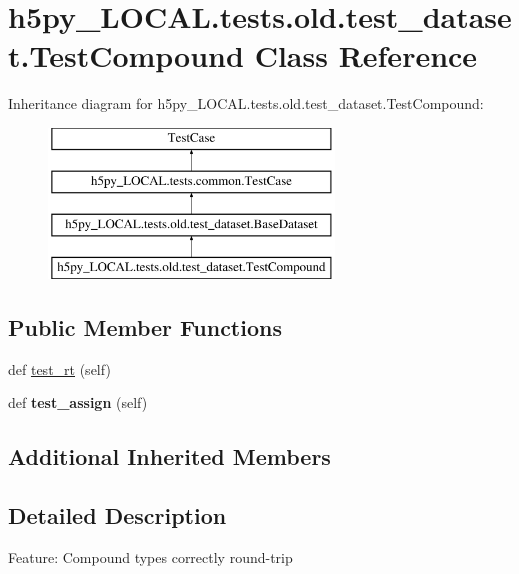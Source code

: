 \hypertarget{classh5py__LOCAL_1_1tests_1_1old_1_1test__dataset_1_1TestCompound}{}\section{h5py\+\_\+\+L\+O\+C\+A\+L.\+tests.\+old.\+test\+\_\+dataset.\+Test\+Compound Class Reference}
\label{classh5py__LOCAL_1_1tests_1_1old_1_1test__dataset_1_1TestCompound}
Inheritance diagram for h5py\+\_\+\+L\+O\+C\+A\+L.\+tests.\+old.\+test\+\_\+dataset.\+Test\+Compound\+:\begin{figure}[H]
\begin{center}
\leavevmode
\includegraphics[height=4.000000cm]{classh5py__LOCAL_1_1tests_1_1old_1_1test__dataset_1_1TestCompound}
\end{center}
\end{figure}
\subsection*{Public Member Functions}
\begin{DoxyCompactItemize}
\item 
def \hyperlink{classh5py__LOCAL_1_1tests_1_1old_1_1test__dataset_1_1TestCompound_a47d6c406ac4def451ba8d75a3efff3e9}{test\+\_\+rt} (self)
\item 
\mbox{\label{classh5py__LOCAL_1_1tests_1_1old_1_1test__dataset_1_1TestCompound_a3fab381c192e03b43419737ebd615fad}} 
def {\bfseries test\+\_\+assign} (self)
\end{DoxyCompactItemize}
\subsection*{Additional Inherited Members}


\subsection{Detailed Description}
\begin{DoxyVerb}    Feature: Compound types correctly round-trip
\end{DoxyVerb}
 

